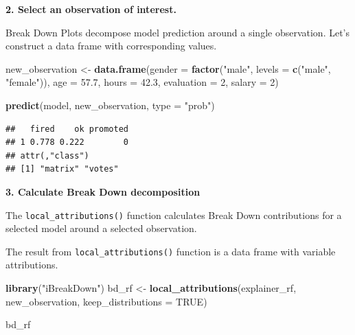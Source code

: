 \documentclass[12pt,]{krantz}
\newenvironment{Shaded}{\begin{snugshade}}{\end{snugshade}}
\newcommand{\DataTypeTok}[1]{\textcolor[rgb]{0.13,0.29,0.53}{#1}}
\newcommand{\DecValTok}[1]{\textcolor[rgb]{0.00,0.00,0.81}{#1}}
\newcommand{\FloatTok}[1]{\textcolor[rgb]{0.00,0.00,0.81}{#1}}
\newcommand{\KeywordTok}[1]{\textcolor[rgb]{0.13,0.29,0.53}{\textbf{#1}}}
\newcommand{\NormalTok}[1]{#1}
\newcommand{\OperatorTok}[1]{\textcolor[rgb]{0.81,0.36,0.00}{\textbf{#1}}}
\newcommand{\OtherTok}[1]{\textcolor[rgb]{0.56,0.35,0.01}{#1}}
\newcommand{\StringTok}[1]{\textcolor[rgb]{0.31,0.60,0.02}{#1}}
\theoremstyle{definition}
\theoremstyle{definition}
\theoremstyle{definition}
\theoremstyle{remark}
\begin{document}
\begin{Shaded}
\end{Shaded}

\textbf{2. Select an observation of interest.}

Break Down Plots decompose model prediction around a single observation.
Let's construct a data frame with corresponding values.

\begin{Shaded}
\begin{Highlighting}[]
\NormalTok{new_observation <-}\StringTok{ }\KeywordTok{data.frame}\NormalTok{(}\DataTypeTok{gender =} \KeywordTok{factor}\NormalTok{(}\StringTok{"male"}\NormalTok{, }\DataTypeTok{levels =} \KeywordTok{c}\NormalTok{(}\StringTok{"male"}\NormalTok{, }\StringTok{"female"}\NormalTok{)),}
                      \DataTypeTok{age =} \FloatTok{57.7}\NormalTok{,}
                      \DataTypeTok{hours =} \FloatTok{42.3}\NormalTok{,}
                      \DataTypeTok{evaluation =} \DecValTok{2}\NormalTok{,}
                      \DataTypeTok{salary =} \DecValTok{2}\NormalTok{)}

\KeywordTok{predict}\NormalTok{(model, new_observation, }\DataTypeTok{type =} \StringTok{"prob"}\NormalTok{)}
\end{Highlighting}
\end{Shaded}

\begin{verbatim}
##   fired    ok promoted
## 1 0.778 0.222        0
## attr(,"class")
## [1] "matrix" "votes"
\end{verbatim}

\textbf{3. Calculate Break Down decomposition}

The \texttt{local\_attributions()} function calculates Break Down
contributions for a selected model around a selected observation.

The result from \texttt{local\_attributions()} function is a data frame
with variable attributions.

\begin{Shaded}
\begin{Highlighting}[]
\KeywordTok{library}\NormalTok{(}\StringTok{"iBreakDown"}\NormalTok{)}
\NormalTok{bd_rf <-}\StringTok{ }\KeywordTok{local_attributions}\NormalTok{(explainer_rf,}
\NormalTok{                 new_observation,}
                 \DataTypeTok{keep_distributions =} \OtherTok{TRUE}\NormalTok{)}

\NormalTok{bd_rf}
\end{Highlighting}
\end{Shaded}
\end{document}
